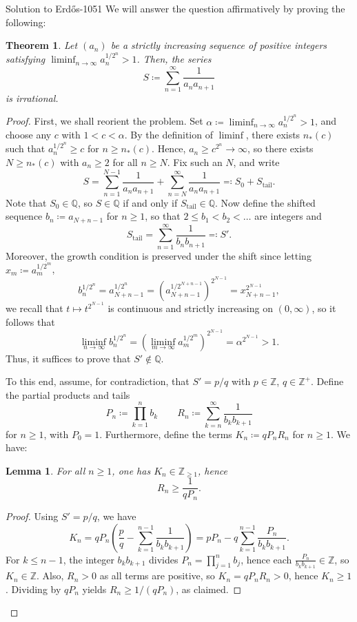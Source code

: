 \documentclass{article}
\theoremstyle{plain}
\newtheorem{theorem}{Theorem}
\newtheorem{lemma}{Lemma}
\theoremstyle{definition}
\begin{document}
\begin{solution}{Solution to Erdős-1051}  We will answer the question affirmatively by proving the following:

\begin{theorem}
    Let $(a_n)$ be a strictly increasing sequence of positive integers satisfying $\liminf_{n\to\infty} a_n^{1/2^n}>1$. Then, the series \[S\coloneq\sum_{n=1}^{\infty}\frac{1}{a_n a_{n+1}}\] is irrational.
\end{theorem}
\begin{proof}
    First, we shall reorient the problem. Set $\alpha\coloneq\liminf_{n\to\infty} a_n^{1/2^n}>1$, and choose any $c$ with $1<c<\alpha$. By the definition of $\liminf$, there exists $n_*(c)$ such that $a_n^{1/2^n}\geq c$ for $n\geq n_*(c)$. Hence, $a_n\geq c^{2^n}\to\infty$, so there exists $N\geq n_*(c)$ with $a_n\geq 2$ for all $n\geq N$. Fix such an $N$, and write $$S=\sum_{n=1}^{N-1}\frac{1}{a_n a_{n+1}}+\sum_{n=N}^{\infty}\frac{1}{a_n a_{n+1}}\eqcolon S_0+S_{\mathrm{tail}}.$$ Note that $S_0\in\mathbb{Q}$, so $S\in\mathbb{Q}$ if and only if $S_{\mathrm{tail}}\in\mathbb{Q}$. Now define the shifted sequence $b_n\coloneq a_{N+n-1}$ for $n\geq 1$, so that $2\leq b_1<b_2<\dots$ are integers and \[S_{\mathrm{tail}}=\sum_{n=1}^{\infty}\frac{1}{b_n b_{n+1}}\eqcolon S'.\] Moreover, the growth condition is preserved under the shift since letting $x_m\coloneq a_m^{1/2^m}$, \[b_n^{1/2^n}=a_{N+n-1}^{1/2^n}=\left(a_{N+n-1}^{1/2^{N+n-1}}\right)^{2^{N-1}}=x_{N+n-1}^{2^{N-1}},\] we recall that $t\mapsto t^{2^{N-1}}$ is continuous and strictly increasing on $(0,\infty)$, so it follows that \[\liminf_{n\to\infty}b_n^{1/2^n}=\left(\liminf_{m\to\infty}a_m^{1/2^m}\right)^{2^{N-1}}=\alpha^{2^{N-1}}>1.\] Thus, it suffices to prove that $S'\notin\mathbb{Q}$.

    To this end, assume, for contradiction, that $S'=p/q$ with $p\in\mathbb{Z}$, $q\in\mathbb{Z}^+$. Define the partial products and tails \[P_n\coloneq\prod_{k=1}^{n}b_k\qquad R_n\coloneq\sum_{k=n}^{\infty}\frac{1}{b_k b_{k+1}}\] for $n\geq 1$, with $P_0=1$. Furthermore, define the terms $K_n\coloneq q P_n R_n$ for $n\geq 1$. We have:

    \begin{lemma}\label{lem:R_n_lower_bound}
        For all $n\geq 1$, one has $K_n\in\mathbb{Z}_{\geq 1}$, hence \[R_n\geq\frac{1}{q P_n}.\]
    \end{lemma}
    \begin{proof}
        Using $S'=p/q$, we have \[K_n=qP_n\left(\frac{p}{q}-\sum_{k=1}^{n-1}\frac{1}{b_k b_{k+1}}\right)=pP_n-q\sum_{k=1}^{n-1}\frac{P_n}{b_kb_{k+1}}.\] For $k\leq n-1$, the integer $b_k b_{k+1}$ divides $P_n=\prod_{j=1}^{n}b_j$, hence each $\frac{P_n}{b_k b_{k+1}}\in\mathbb{Z}$, so $K_n\in\mathbb{Z}$. Also, $R_n>0$ as all terms are positive, so $K_n=qP_nR_n>0$, hence $K_n\geq 1$. Dividing by $qP_n$ yields $R_n\geq 1/(qP_n)$, as claimed.
    \end{proof}


\end{proof}
\end{solution}
\end{document}
